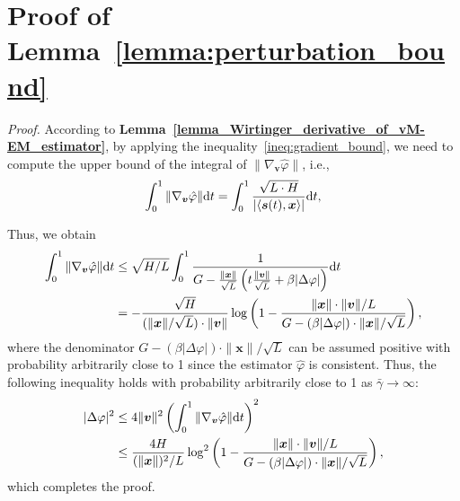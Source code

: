 \documentclass[a4paper,12pt]{article}
\begin{document}
\section*{Proof of Lemma~\ref{lemma:perturbation_bound}}
{\it Proof.} According to {\bf Lemma~\ref{lemma_Wirtinger_derivative_of_vM-EM_estimator}}, by applying the inequality~\eqref{ineq:gradient_bound}, we need to compute the upper bound of the integral of $\|\nabla_{\bm v}\hat{\varphi}\|$, i.e.,
\begin{equation}
    \int_{0}^{1} \|\nabla_{\bm v}\hat{\varphi}\|{\rm d}t = \int_{0}^{1} \frac{\sqrt{L\cdot H}}{|\langle{\bm s}(t), {\bm x}\rangle|} {\rm d} t,
\end{equation}

Thus, we obtain 
\begin{equation}
    \begin{aligned}
        \int_{0}^{1} \|\nabla_{\bm v}\hat{\varphi}\|{\rm d}t & \leq \sqrt{H/L} \int_0^1 \frac{1}{G-\frac{\|{\bm x}\|}{\sqrt{L}} \left( t\frac{\|{\bm v}\|}{\sqrt{L}} + \beta|\Delta\varphi| \right)}{\rm d}t \\
        & = -\frac{\sqrt{H}}{(\|{\bm x}\|/\sqrt{L})\cdot\|{\bm v}\|} \log\left(1-\frac{\|{\bm x}\|\cdot\|{\bm v}\|/L}{G-(\beta|\Delta\varphi|)\cdot \|{\bm x}\|/\sqrt{L}}\right), 
    \end{aligned}
\end{equation}
where the denominator $G-(\beta|\Delta\varphi|)\cdot \|{\bm x}\|/\sqrt{L}$ can be assumed positive with probability arbitrarily close to 1 since the estimator $\hat{\varphi}$ is consistent. Thus, the following inequality holds with probability arbitrarily close to 1 as $\bar{\gamma}\to\infty$:  
\begin{equation}
    \begin{aligned}
        |\Delta\varphi|^2 &\leq 4\|{\bm v}\|^2 \left(\int_0^1 \|\nabla_{\bm v}\hat{\varphi}\|{\rm d}t\right)^2 \\
        & \leq \frac{4H}{(\|{\bm x}\|)^2/L}\log^2\left(1-\frac{\|{\bm x}\|\cdot\|{\bm v}\|/L}{G-(\beta|\Delta\varphi|)\cdot \|{\bm x}\|/\sqrt{L}}\right),
    \end{aligned}
\end{equation}
which completes the proof. 
\end{document}
